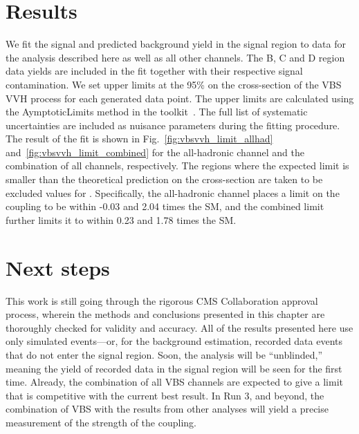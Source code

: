 \section{Results}
We fit the signal and predicted background yield in the signal region to data for the analysis described here as well as all other channels.
The B, C and D region data yields are included in the fit together with their respective signal contamination. 
We set upper limits at the 95\% \CL on the cross-section of the VBS VVH process for each \kVV generated data point. 
The upper limits are calculated using the AymptoticLimits method in the \COMBINE toolkit~\cite{CombinePaper}.
The full list of systematic uncertainties are included as nuisance parameters during the fitting procedure.
The result of the fit is shown in Fig.~\ref{fig:vbsvvh_limit_allhad} and~\ref{fig:vbsvvh_limit_combined} for the all-hadronic channel and the combination of all channels, respectively. 
The regions where the expected limit is smaller than the theoretical prediction on the cross-section are taken to be excluded values for \kVV. 
Specifically, the all-hadronic channel places a limit on the \HHVV coupling to be within -0.03 and 2.04 times the SM, and the combined limit further limits it to within 0.23 and 1.78 times the SM. 

\section{Next steps}
This work is still going through the rigorous CMS Collaboration approval process, wherein the methods and conclusions presented in this chapter are thoroughly checked for validity and accuracy. 
All of the results presented here use only simulated events---or, for the background estimation, recorded data events that do not enter the signal region. 
Soon, the analysis will be ``unblinded,'' meaning the yield of recorded data in the signal region will be seen for the first time. 
Already, the combination of all VBS \VVH channels are expected to give a limit that is competitive with the current best result. 
In Run 3, and beyond, the combination of VBS \VVH with the results from other analyses will yield a precise measurement of the strength of the \HHVV coupling.

